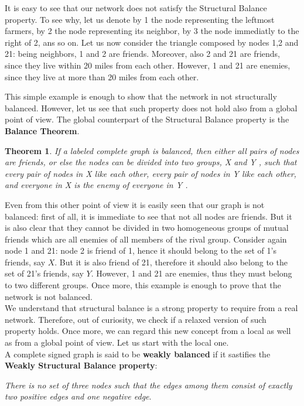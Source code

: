 \documentclass{report}
\newtheorem*{thm}{Theorem}
\theoremstyle{definition}
\theoremstyle{remark}
\begin{document}
It is easy to see that our network does not satisfy the Structural Balance property. To see why, let us denote by 1 the node representing the leftmost farmers, by 2 the node representing its neighbor, by 3 the node immediatly to the right of 2, ans so on. Let us now consider the triangle composed by nodes 1,2 and 21: being neighbors, 1 and 2 are friends. Moreover, also 2 and 21 are friends, since they live within 20 miles from each other. However, 1 and 21 are enemies, since they live at more than 20 miles from each other.

This simple example is enough to show that the network in not structurally balanced. However, let us see that such property does not hold also from a global point of view. The global counterpart of the Structural Balance property is the \textbf{Balance Theorem}.
\begin{thm}
	If a labeled complete graph is balanced, then either all pairs
	of nodes are friends, or else the nodes can be divided into two groups, X and Y ,
	such that every pair of nodes in X like each other, every pair of nodes in Y like
	each other, and everyone in X is the enemy of everyone in Y .
\end{thm}
Even from this other point of view it is easily seen that our graph is not balanced: first of all, it is immediate to see that not all nodes are friends. But it is also clear that they cannot be divided in two homogeneous groups of mutual friends which are all enemies of all members of the rival group. Consider again node 1 and 21: node 2 is friend of 1, hence it should belong to the set of 1's friends, say $X$. But it is also friend of 21, therefore it should also belong to the set of 21's friends, say $Y$. However, 1 and 21 are enemies, thus they must belong to two different groups. Once more, this example is enough to prove that the network is not balanced.\\
We understand that structural balance is a strong property to require from a real network. Therefore, out of curiosity, we check if a relaxed version of such property holds. Once more, we can regard this new concept from a local as well as from a global point of view. Let us start with the local one.\\
A complete signed graph is said to be \textbf{weakly balanced} if it sastifies the \textbf{Weakly Structural Balance property}:
\bigskip

\textit{There is no set of three nodes such that the edges among them consist of exactly two positive edges and one negative edge}.
\bigskip
\end{document}
